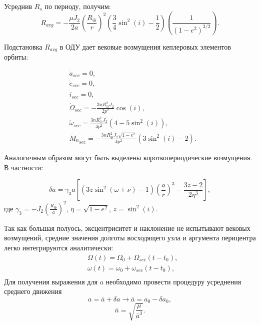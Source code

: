 Усреднив $R_s$ по периоду, получим:
\begin{equation*}
    R_{avg} =  - \frac{\mu J_2}{2 a} \left( \frac{R_\oplus}{r} \right)^2 
                \left( \frac{3}{4} \sin^2(i) - \frac{1}{2} \right)
                \left( \frac{1}{(1 - e^2)^{3/2}} \right).
\end{equation*}

Подстановка $R_{avg}$ в ОДУ дает вековые возмущения кеплеровых элементов орбиты:

\begin{align*}
    & \dot{a}_{sec} = 0, \\
    & \dot{e}_{sec} = 0, \\
    & \dot{i}_{sec} = 0, \\
    & \dot{\Omega}_{sec} = - \frac{3 n R^{2}_\oplus J_2}{2 p^2} \cos(i), \\
    & \dot{\omega}_{sec} = \frac{3 n R^{2}_\oplus J_2}{4 p^2} (4 - 5 \sin^2(i)), \\
    & \dot{M_0}_{sec} = - \frac{3 n R^{2}_\oplus J_2 \sqrt{1 - e^2}}{4 p ^2}
                            (3 \sin^2(i) - 2).
\end{align*}

Аналогичным образом могут быть выделены короткопериодические возмущения. В частности:

\begin{equation*}
    \delta a = \gamma_3 a \left[ (3z \sin^2(\omega + \nu) - 1) \left(\frac{a}{r}\right)^3
                                    - \frac{3z - 2}{2 \eta^3}  \right],
\end{equation*}
где $\gamma_3 = -J_2 \left(\frac{R_\oplus}{a}\right)^2$, $\eta = \sqrt{1 - e^2}$, $z = \sin^2(i)$.

Так как большая полуось, эксцентриситет и наклонение не испытывают вековых возмущений, 
средние значения долготы восходящего узла и аргумента перицентра легко интегрируются аналитически:
\begin{align*}
    & \Omega(t) = \Omega_0 + \Omega_{sec} (t - t_0), \\
    & \omega(t) = \omega_0 + \omega_{sec} (t - t_0), \\
\end{align*}
Для получения выражения для $a$ необходимо провести процедуру усреднения среднего движения
\begin{equation*}
    a = \bar{a} + \delta a \rightarrow  \bar{a} = a_0 - \delta a_0,
\end{equation*}
\begin{equation*}
    \bar{n} = \sqrt{\frac{\mu}{\bar{a}^3}}.
\end{equation*}

